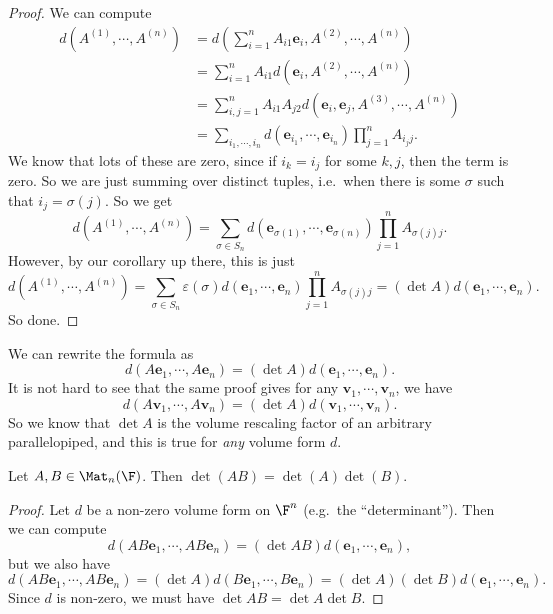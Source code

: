 \documentclass[a4paper]{article}
\begin{document}
\begin{proof}
  We can compute
  \begin{align*}
    d(A^{(1)}, \cdots, A^{(n)}) &= d\left(\sum_{i = 1}^n A_{i1} \mathbf{e}_i, A^{(2)}, \cdots, A^{(n)}\right)\\
    &= \sum_{i = 1}^n A_{i1} d(\mathbf{e}_i, A^{(2)}, \cdots, A^{(n)})\\
    &= \sum_{i, j = 1}^n A_{i1}A_{j2}d(\mathbf{e}_i, \mathbf{e}_j, A^{(3)}, \cdots, A^{(n)})\\
    &= \sum_{i_1, \cdots, i_n} d(\mathbf{e}_{i_1}, \cdots, \mathbf{e}_{i_n})\prod_{j = 1}^n A_{i_j j}.
  \end{align*}
  We know that lots of these are zero, since if $i_k = i_j$ for some $k, j$, then the term is zero. So we are just summing over distinct tuples, i.e.\ when there is some $\sigma$ such that $i_j = \sigma(j)$. So we get
  \[
    d(A^{(1)}, \cdots, A^{(n)}) = \sum_{\sigma \in S_n} d(\mathbf{e}_{\sigma(1)}, \cdots, \mathbf{e}_{\sigma(n)})\prod_{j = 1}^n A_{\sigma(j)j}.
  \]
  However, by our corollary up there, this is just
  \[
    d(A^{(1)}, \cdots, A^{(n)}) = \sum_{\sigma \in S_n} \varepsilon(\sigma) d(\mathbf{e}_1, \cdots, \mathbf{e}_n) \prod_{j = 1}^n A_{\sigma(j)j} = (\det A) d(\mathbf{e}_1, \cdots, \mathbf{e}_n).
  \]
  So done.
\end{proof}
We can rewrite the formula as
\[
  d (A \mathbf{e}_1, \cdots, A\mathbf{e}_n) = (\det A)d(\mathbf{e}_1, \cdots, \mathbf{e}_n).
\]
It is not hard to see that the same proof gives for any $\mathbf{v}_1, \cdots, \mathbf{v}_n$, we have
\[
  d(A\mathbf{v}_1, \cdots, A\mathbf{v}_n) = (\det A)d(\mathbf{v}_1, \cdots, \mathbf{v}_n).
\]
So we know that $\det A$ is the volume rescaling factor of an arbitrary parallelopiped, and this is true for \emph{any} volume form $d$.

\begin{thm}
  Let $A, B \in \Mat_n(\F)$. Then $\det(AB) = \det(A)\det(B)$.
\end{thm}

\begin{proof}
  Let $d$ be a non-zero volume form on $\F^n$ (e.g.\ the ``determinant''). Then we can compute
  \[
    d(AB\mathbf{e}_1,\cdots , AB\mathbf{e}_n) = (\det AB) d(\mathbf{e}_1,\cdots, \mathbf{e}_n),
  \]
  but we also have
  \[
    d(AB\mathbf{e}_1, \cdots, AB\mathbf{e}_n) = (\det A) d(B\mathbf{e}_1, \cdots, B\mathbf{e}_n) = (\det A)(\det B)d(\mathbf{e}_1, \cdots, \mathbf{e}_n).
  \]
  Since $d$ is non-zero, we must have $\det AB = \det A \det B$.
\end{proof}
\end{document}
